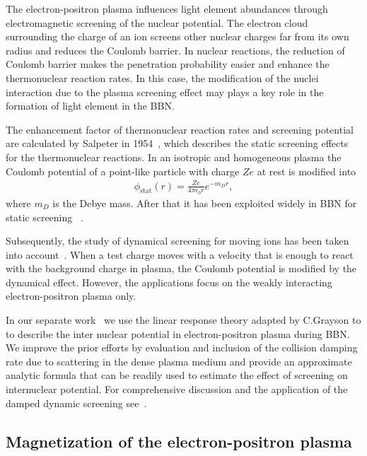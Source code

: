 The electron-positron plasma influences light element abundances through electromagnetic screening of the nuclear potential. The electron cloud surrounding the charge of an ion screens other nuclear charges far from its own radius and reduces the Coulomb barrier. In nuclear reactions, the reduction of Coulomb barrier makes the penetration probability easier and enhance the thermonuclear reaction rates. In this case, the modification of the nuclei interaction due to the plasma screening effect may plays a key role in the formation of light element in the BBN. 

The enhancement factor of thermonuclear reaction rates and screening potential are calculated by Salpeter in 1954~\cite{Salpeter:1954nc}, which describes the static screening effects for the thermonuclear reactions. In an isotropic and homogeneous plasma the Coulomb potential of a point-like particle with charge $Ze$ at rest is modified into~\cite{Salpeter:1954nc}
\begin{align}
\phi_\text{stat}(r)=\frac{Ze}{4\pi\epsilon_0 r}e^{-m_Dr},
\end{align}
where $m_D$ is the Debye mass. After that it has been exploited widely in BBN for static screening ~\cite{1969ApJ...155..183S,Famiano:2016hhs}. 

Subsequently, the study of dynamical screening for moving ions has been taken into account~\cite{1988ApJ...331..565C,Gruzinov:1997as,Hwang:2021kno}. When a test charge moves with a velocity that is enough to react with the background charge in plasma, the Coulomb potential is modified by the dynamical effect. However, the applications focus on the weakly interacting electron-positron plasma only. 

In our separate work~\cite{Grayson:2023flr} we use the linear response theory adapted by C.Grayson to to describe the inter nuclear potential in electron-positron plasma during BBN. We improve the prior efforts by evaluation and inclusion of the collision damping rate due to scattering in the dense plasma medium and provide an approximate analytic formula that can be readily used to estimate the effect of screening on internuclear potential. For comprehensive discussion and the application of the damped dynamic screening see~\cite{Grayson:2023flr}.










\subsection{Magnetization of the electron-positron plasma}


